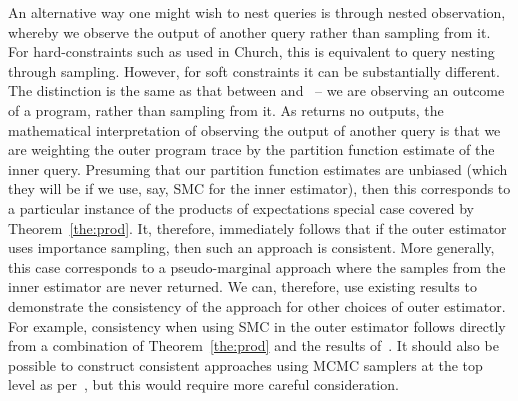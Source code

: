 An alternative way one might wish to nest queries is through nested observation, whereby we
observe the output of another query rather than sampling from it.  For hard-constraints such
as used in Church, this is equivalent to query nesting through sampling.  However, for soft
constraints it can be substantially different.  The distinction is the same as that between
\sample and \observe~-- we are observing an outcome of a program, rather than sampling
from it.  As \observe returns no outputs, the mathematical interpretation of observing 
the output of another query is that we are weighting the outer program trace by the
partition function estimate of the inner query.  Presuming that our partition function estimates
are unbiased (which they will be if we use, say, SMC for the inner estimator), then
this corresponds to a particular instance of the products of expectations special case
covered by Theorem~\ref{the:prod}.  It, therefore, immediately follows that if
the outer estimator uses importance sampling, then such an approach is consistent.  More
generally, this case corresponds to a pseudo-marginal approach where the samples
from the inner estimator are never returned.  We can, therefore, use existing results
to demonstrate the consistency of the approach for other choices of outer estimator.
For example, consistency when using SMC in the outer estimator follows directly
from a combination of Theorem~\ref{the:prod} and the results of~\cite{naessethLS2015nested}.
It should also be possible to construct consistent approaches using MCMC samplers
at the top level as per~\cite{andrieu2009pseudo}, but this would require more
careful consideration.

